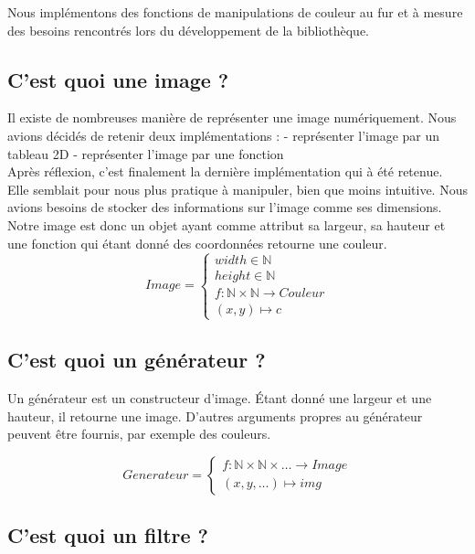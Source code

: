 \documentclass{article}
\begin{document}
Nous implémentons des fonctions de manipulations de couleur au fur et à mesure des besoins rencontrés lors du développement de la bibliothèque.

\subsection{C'est quoi une image ?}
\label{sec:image}

Il existe de nombreuses manière de représenter une image numériquement. Nous avions décidés de retenir deux implémentations : - représenter l'image par un tableau 2D - représenter l'image par une fonction \\
Après réflexion, c'est finalement la dernière implémentation qui à été retenue. Elle semblait pour nous plus pratique à manipuler, bien que moins intuitive. Nous avions besoins de stocker des informations sur l'image comme ses dimensions. Notre image est donc un objet ayant comme attribut sa largeur, sa hauteur et une fonction qui étant donné des coordonnées retourne une couleur.
\begin{equation*}
    Image = \left\{\begin{matrix}
            width \in \mathbb{N} \\
            height \in \mathbb{N} \\ 
            f : \mathbb{N} \times \mathbb{N} \rightarrow Couleur \\ 
            (x,y) \mapsto c
\end{matrix}\right.
\end{equation*}
 
\subsection{C'est quoi un générateur ?}

Un générateur est un constructeur d'image. Étant donné une largeur et une hauteur, il retourne une image. D'autres arguments propres au générateur peuvent être fournis, par exemple des couleurs.

\begin{equation*}
    Generateur = \left\{\begin{matrix}
                f : \mathbb{N} \times \mathbb{N} \times \dots \rightarrow Image \\ 
                (x,y, \dots) \mapsto img
\end{matrix}\right.
\end{equation*}

\subsection{C'est quoi un filtre ?}
\end{document}
